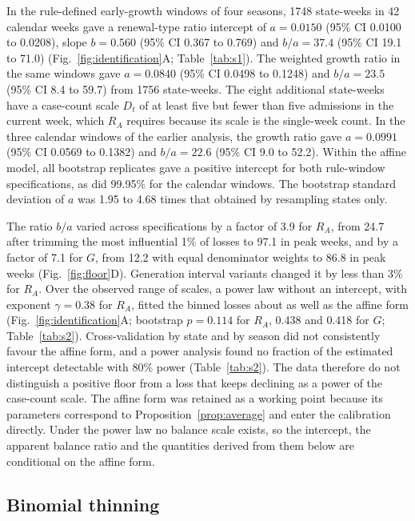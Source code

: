In the rule-defined early-growth windows of four seasons, 1748 state-weeks in 42 calendar weeks gave a renewal-type ratio intercept of $a=0.0150$ (95\% CI 0.0100 to 0.0208), slope $b=0.560$ (95\% CI 0.367 to 0.769) and $b/a=37.4$ (95\% CI 19.1 to 71.0) (Fig.~\ref{fig:identification}A; Table~\ref{tab:s1}). The weighted growth ratio in the same windows gave $a=0.0840$ (95\% CI 0.0498 to 0.1248) and $b/a=23.5$ (95\% CI 8.4 to 59.7) from 1756 state-weeks. The eight additional state-weeks have a case-count scale $D_t$ of at least five but fewer than five admissions in the current week, which $R_A$ requires because its scale is the single-week count. In the three calendar windows of the earlier analysis, the growth ratio gave $a=0.0991$ (95\% CI 0.0569 to 0.1382) and $b/a=22.6$ (95\% CI 9.0 to 52.2). Within the affine model, all bootstrap replicates gave a positive intercept for both rule-window specifications, as did 99.95\% for the calendar windows. The bootstrap standard deviation of $a$ was 1.95 to 4.68 times that obtained by resampling states only.

The ratio $b/a$ varied across specifications by a factor of 3.9 for $R_A$, from 24.7 after trimming the most influential 1\% of losses to 97.1 in peak weeks, and by a factor of 7.1 for $G$, from 12.2 with equal denominator weights to 86.8 in peak weeks (Fig.~\ref{fig:floor}D). Generation interval variants changed it by less than 3\% for $R_A$. Over the observed range of scales, a power law without an intercept, with exponent $\gamma=0.38$ for $R_A$, fitted the binned losses about as well as the affine form (Fig.~\ref{fig:identification}A; bootstrap $p=0.114$ for $R_A$, 0.438 and 0.418 for $G$; Table~\ref{tab:s2}). Cross-validation by state and by season did not consistently favour the affine form, and a power analysis found no fraction of the estimated intercept detectable with 80\% power (Table~\ref{tab:s2}). The data therefore do not distinguish a positive floor from a loss that keeps declining as a power of the case-count scale. The affine form was retained as a working point because its parameters correspond to Proposition~\ref{prop:average} and enter the calibration directly. Under the power law no balance scale exists, so the intercept, the apparent balance ratio and the quantities derived from them below are conditional on the affine form.

\subsection{Binomial thinning}
\label{sec:res-thinning}

